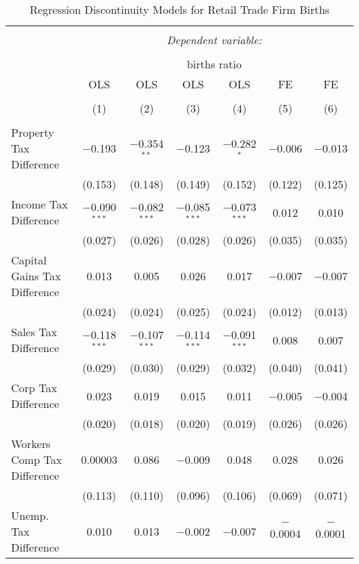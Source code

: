 
\begin{table}[!htbp] \centering 
  \caption{Regression Discontinuity Models for  Retail Trade Firm Births} 
  \label{44-45rd} 
\begin{tabular}{@{\extracolsep{5pt}}lcccccc} 
\\[-1.8ex]\hline 
\hline \\[-1.8ex] 
 & \multicolumn{6}{c}{\textit{Dependent variable:}} \\ 
\cline{2-7} 
\\[-1.8ex] & \multicolumn{6}{c}{births ratio} \\ 
 & OLS & OLS & OLS & OLS & FE & FE \\ 
\\[-1.8ex] & (1) & (2) & (3) & (4) & (5) & (6)\\ 
\hline \\[-1.8ex] 
 Property Tax Difference & $-$0.193 & $-$0.354$^{**}$ & $-$0.123 & $-$0.282$^{*}$ & $-$0.006 & $-$0.013 \\ 
  & (0.153) & (0.148) & (0.149) & (0.152) & (0.122) & (0.125) \\ 
  Income Tax Difference & $-$0.090$^{***}$ & $-$0.082$^{***}$ & $-$0.085$^{***}$ & $-$0.073$^{***}$ & 0.012 & 0.010 \\ 
  & (0.027) & (0.026) & (0.028) & (0.026) & (0.035) & (0.035) \\ 
  Capital Gains Tax Difference & 0.013 & 0.005 & 0.026 & 0.017 & $-$0.007 & $-$0.007 \\ 
  & (0.024) & (0.024) & (0.025) & (0.024) & (0.012) & (0.013) \\ 
  Sales Tax Difference & $-$0.118$^{***}$ & $-$0.107$^{***}$ & $-$0.114$^{***}$ & $-$0.091$^{***}$ & 0.008 & 0.007 \\ 
  & (0.029) & (0.030) & (0.029) & (0.032) & (0.040) & (0.041) \\ 
  Corp Tax Difference & 0.023 & 0.019 & 0.015 & 0.011 & $-$0.005 & $-$0.004 \\ 
  & (0.020) & (0.018) & (0.020) & (0.019) & (0.026) & (0.026) \\ 
  Workers Comp Tax Difference & 0.00003 & 0.086 & $-$0.009 & 0.048 & 0.028 & 0.026 \\ 
  & (0.113) & (0.110) & (0.096) & (0.106) & (0.069) & (0.071) \\ 
  Unemp. Tax Difference & 0.010 & 0.013 & $-$0.002 & $-$0.007 & $-$0.0004 & $-$0.0001 \\ 

\end{tabular}
\end{table}
